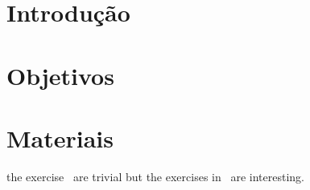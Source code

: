 \documentclass[a4paper, 11pt]{article}
\begin{document}
    

    \section{Introdução}\label{sec:intro}
    

    \section{Objetivos}\label{sec:objetivos}
    

    \section{Materiais}\label{sec:materiais}
    

    \indent the exercise~\cite{atalho} are trivial but the exercises in~\cite{atalho} are interesting.
    
    
\end{document}
